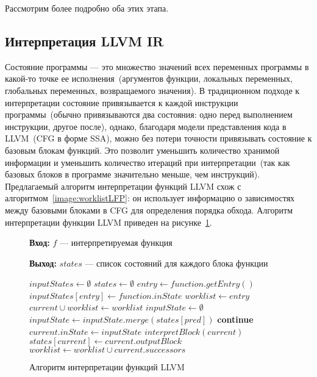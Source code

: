 Рассмотрим более подробно оба этих этапа.

\subsection{Интерпретация LLVM IR}
Состояние программы --- это множество значений всех переменных программы в 
какой-то точке ее исполнения~(аргументов функции, локальных переменных, 
глобальных переменных, возвращаемого значения). В традиционном подходе к 
интерпретации состояние привязывается к каждой инструкции программы~(обычно 
привязываются два состояния: одно перед выполнением инструкции, другое после), 
однако, благодаря модели представления кода в LLVM~(CFG в форме SSA), можно 
без потери точности привязывать состояние к базовым блокам функций. Это 
позволит уменьшить количество хранимой информации и уменьшить количество 
итераций при интерпретации~(так как базовых блоков в программе значительно 
меньше, чем инструкций). Предлагаемый алгоритм интерпретации функций LLVM схож 
с алгоритмом~\ref{image:worklistLFP}: он использует информацию о зависимостях
между базовыми блоками в CFG для определения порядка обхода. Алгоритм 
интерпретации функции LLVM приведен на 
рисунке~\ref{image:functionInterpretation}.

\begin{figure}[h!]
\textbf{Вход:} $f$ --- интерпретируемая функция

\textbf{Выход:} $states$ --- список состояний для каждого блока функции

\begin{algorithmic}[1]
\State $inputStates \gets \emptyset$
\State $states \gets \emptyset$
\State $entry \gets function.getEntry()$
\State $inputStates[entry] \gets function.inState$
\State $worklist \gets entry$
    \State $current \cup worklist \gets worklist$
    \State $inputState \gets \emptyset$
        \State $inputState \gets inputState.merge(states[pred])$
    \EndFor
        \State \textbf{continue}
    \EndIf
    \State $current.inState \gets inputState$
    \State $interpretBlock(current)$
    \State $states[current] \gets current.outputBlock$
    \State $worklist \gets worklist \cup current.successors$
\EndWhile
\end{algorithmic}
\caption{Алгоритм интерпретации функций LLVM}
\label{image:functionInterpretation}
\end{figure}

